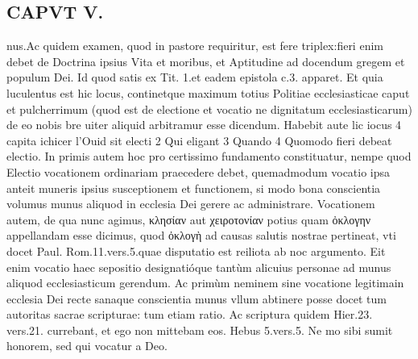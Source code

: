 \documentclass{article}
\begin{document}
\begin{pages}
\section*{CAPVT  V. }
\marginpar{[ p.241 ]}\pstart nus.Ac quidem examen, quod in pastore requiritur, est fere triplex:fieri enim debet de Doctrina ipsius Vita et moribus, et Aptitudine ad docendum gregem et populum Dei. Id quod satis ex Tit. 1.et eadem epistola c.3. apparet.  \pend\pstart Et quia luculentus est hic locus, continetque maximum totius Politiae ecclesiasticae caput et pulcherrimum (quod est de electione et vocatio ne dignitatum ecclesiasticarum) de eo nobis bre uiter aliquid arbitramur esse dicendum. Habebit aute lic iocus 4 capita ichicer l'Ouid sit electi 2 Qui eligant 3 Quando 4 Quomodo fieri debeat electio. In primis autem hoc pro certissimo fundamento constituatur, nempe quod  \pend\pstart Electio vocationem ordinariam praecedere debet, quemadmodum vocatio ipsa anteit muneris ipsius susceptionem et functionem, si modo bona conscientia volumus munus aliquod in ecclesia Dei gerere ac administrare. Vocationem autem, de qua nunc agimus, κλησίαν aut χειροτονίαν potius quam ὀκλογην appellandam esse dicimus, quod ὀκλογὴ ad causas salutis nostrae pertineat, vti docet Paul. Rom.11.vers.5.quae disputatio est reiliota ab noc argumento. Eit enim vocatio haec sepositio designatióque tantùm alicuius personae ad munus aliquod ecclesiasticum gerendum.  \pend\pstart Ac primùm neminem sine vocatione legitimain ecclesia Dei recte sanaque conscientia munus vllum abtinere posse docet tum autoritas sacrae scripturae: tum etiam ratio.  \pend\pstart Ac scriptura quidem Hier.23. vers.21. currebant, et ego non mittebam eos. Hebus 5.vers.5. Ne mo sibi sumit honorem, sed qui vocatur a Deo.  \pend

\end{pages}
\end{document}
